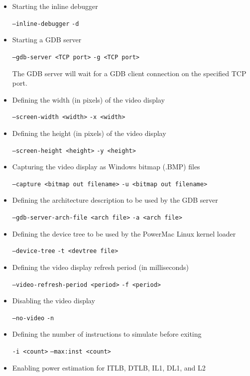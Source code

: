 \begin{itemize}

\item Starting the inline debugger

\texttt{--inline-debugger}
\texttt{-d}

\item Starting a GDB server

\texttt{--gdb-server <TCP port>}
\texttt{-g <TCP port>}

The GDB server will wait for a GDB client connection on the specified TCP port.

\item Defining the width (in pixels) of the video display

\texttt{--screen-width <width>}
\texttt{-x <width>}

\item Defining the height (in pixels) of the video display

\texttt{--screen-height <height>}
\texttt{-y <height>}

\item Capturing the video display as Windows bitmap (.BMP) files

\texttt{--capture <bitmap out filename>}
\texttt{-u <bitmap out filename>}

\item Defining the architecture description to be used by the GDB server

\texttt{--gdb-server-arch-file <arch file>}
\texttt{-a  <arch file>}

\item Defining the device tree to be used by the PowerMac Linux kernel loader

\texttt{--device-tree}
\texttt{-t  <devtree file>}

\item Defining the video display refresh period (in milliseconds)

\texttt{--video-refresh-period <period>}
\texttt{-f <period>}

\item Disabling the video display

\texttt{--no-video}
\texttt{-n}

\item Defining the number of instructions to simulate before exiting

\texttt{-i <count>}
\texttt{--max:inst <count>}

\item Enabling power estimation for ITLB, DTLB, IL1, DL1, and L2


\end{itemize}
